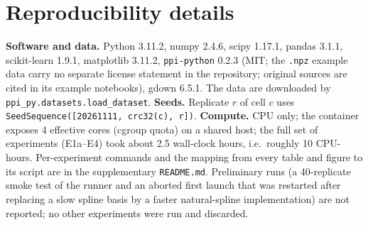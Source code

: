 \section{Reproducibility details}\label{app:repro}
\textbf{Software and data.} Python 3.11.2, numpy 2.4.6, scipy 1.17.1, pandas 3.1.1, scikit-learn 1.9.1, matplotlib 3.11.2, \texttt{ppi-python} 0.2.3 (MIT; the \texttt{.npz} example data carry no separate license statement in the repository; original sources are cited in its example notebooks), gdown 6.5.1. The data are downloaded by \texttt{ppi\_py.datasets.load\_dataset}. \textbf{Seeds.} Replicate $r$ of cell $c$ uses \texttt{SeedSequence([20261111, crc32(c), r])}. \textbf{Compute.} CPU only; the container exposes 4 effective cores (cgroup quota) on a shared host; the full set of experiments (E1a--E4) took about 2.5 wall-clock hours, i.e.\ roughly 10 CPU-hours. Per-experiment commands and the mapping from every table and figure to its script are in the supplementary \texttt{README.md}. Preliminary runs (a 40-replicate smoke test of the runner and an aborted first launch that was restarted after replacing a slow spline basis by a faster natural-spline implementation) are not reported; no other experiments were run and discarded.
